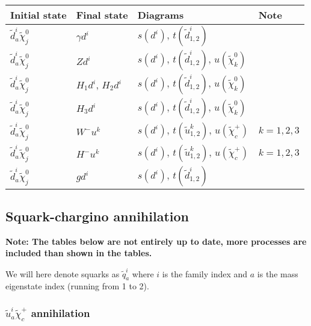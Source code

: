 \begin{center}
\begin{tabular}{llll} \hline
{\bfseries Initial state} & {\bfseries Final state} &
{\bfseries Diagrams} & {\bfseries Note} \\ \hline \tabspace
$\tilde{d}^i_a \tilde{\chi}_{j}^0$ & $\gamma d^i$ &
$s(d^{i})$, $t(\tilde{d}^i_{1,2})$  \\
$\tilde{d}^i_a \tilde{\chi}_{j}^0$ & $Z d^i$ &
$s(d^{i})$, $t(\tilde{d}^i_{1,2})$, $u(\tilde{\chi}_k^0)$ \\
$\tilde{d}^i_a \tilde{\chi}_{j}^0$ & $H_{1} d^i$, $H_{2} d^i$ &
$s(d^{i})$, $t(\tilde{d}^i_{1,2})$, $u(\tilde{\chi}_k^0)$ \\
$\tilde{d}^i_a \tilde{\chi}_{j}^0$ & $H_{3} d^i$  &
$s(d^{i})$, $t(\tilde{d}^i_{1,2})$, $u(\tilde{\chi}_k^0)$ \\ 
$\tilde{d}^i_a \tilde{\chi}_{j}^0$ & $W^- u^k$  &
$s(d^{i})$, $t(\tilde{u}^k_{1,2})$, $u(\tilde{\chi}_c^+)$ 
& $k=1,2,3$ \\
$\tilde{d}^i_a \tilde{\chi}_{j}^0$ & $H^- u^k$  &
$s(d^{i})$, $t(\tilde{u}^k_{1,2})$, $u(\tilde{\chi}_c^+)$ 
& $k=1,2,3$  \\
$\tilde{d}^i_a \tilde{\chi}_{j}^0$ & $g d^i$  &
$s(d^i)$, $t(\tilde{d}^i_{1,2})$ \\ \hline
\end{tabular}
\end{center}

\subsection{Squark-chargino annihilation}

{\bfseries Note: The tables below are not entirely up to date, more processes are included
than shown in the tables.}

\smallskip


We will here denote squarks as $\tilde{q}^i_a$ where $i$ is the family
index and $a$ is the mass eigenstate index (running from 1 to 2).

\subsubsection{$\tilde{u}^i_{a} \tilde{\chi}_{c}^{+}$ annihilation}

